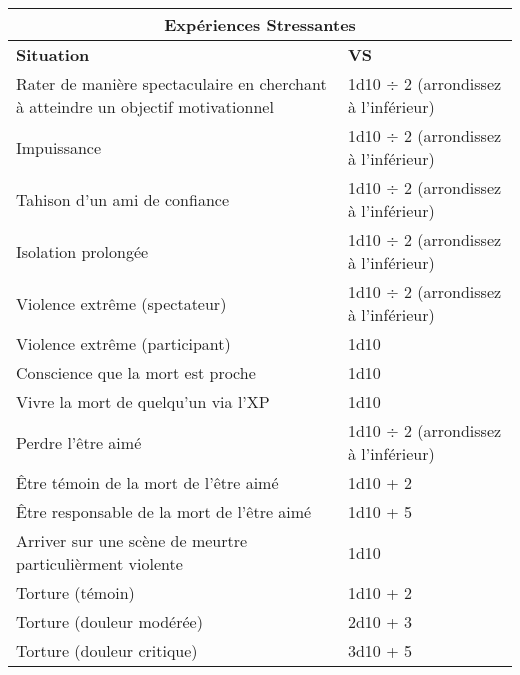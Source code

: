 \begin{table} \begin{tabularx}{\textwidth}{|X|l|} \hline

\multicolumn{2}{|c|}{\textbf{Expériences Stressantes} } \\ \hline

\textbf{Situation}	&\textbf{VS} \\ \hline

Rater de manière spectaculaire en cherchant à atteindre un objectif motivationnel	&1d10 $\div$ 2 (arrondissez à l'inférieur)	\\ \hline

Impuissance	&1d10 $\div$ 2 (arrondissez à l'inférieur)	\\ \hline

Tahison d'un ami de confiance	&1d10 $\div$ 2 (arrondissez à l'inférieur)	\\ \hline

Isolation prolongée	&1d10 $\div$ 2 (arrondissez à l'inférieur)	\\ \hline

Violence extrême (spectateur)	&1d10 $\div$ 2 (arrondissez à l'inférieur)	\\ \hline

Violence extrême (participant)	&1d10	\\ \hline

Conscience que la mort est proche	&1d10	\\ \hline

Vivre la mort de quelqu'un via l'XP	&1d10	\\ \hline

Perdre l'être aimé	&1d10 $\div$ 2 (arrondissez à l'inférieur)	\\ \hline

Être témoin de la mort de l'être aimé	&1d10 + 2	\\ \hline

Être responsable de la mort de l'être aimé	&1d10 + 5	\\ \hline

Arriver sur une scène de meurtre particulièrment violente	&1d10	\\ \hline

Torture (témoin)	&1d10 + 2	\\ \hline

Torture (douleur modérée)	&2d10 + 3	\\ \hline

Torture (douleur critique)	&3d10 + 5	\\ \hline


\end{tabularx}
\end{table}
